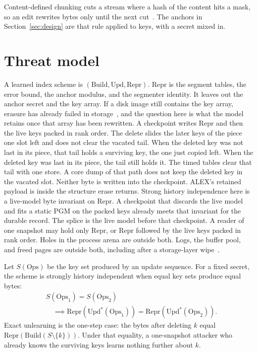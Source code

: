 \documentclass[conference]{IEEEtran}
\begin{document}
Content-defined chunking cuts a stream where a hash of the content hits a mask, so an edit rewrites bytes only until the next cut~\cite{muthitacharoen2001lbfs}.
The anchors in Section~\ref{sec:design} are that rule applied to keys, with a secret mixed in.

\section{Threat model}
\label{sec:threat}

A learned index scheme is $(\mathrm{Build},\mathrm{Upd},\mathrm{Repr})$.
$\mathrm{Repr}$ is the segment tables, the error bound, the anchor modulus, and the segmenter identity.
It leaves out the anchor secret and the key array.
If a disk image still contains the key array, erasure has already failed in storage~\cite{sarkar2023lethe,wagner2024dbsanitizer}, and the question here is what the model retains once that array has been rewritten.
A checkpoint writes $\mathrm{Repr}$ and then the live keys packed in rank order.
The delete slides the later keys of the piece one slot left and does not clear the vacated tail.
When the deleted key was not last in its piece, that tail holds a surviving key, the one just copied left.
When the deleted key was last in its piece, the tail still holds it.
The timed tables clear that tail with one store. A core dump of that path does not keep the deleted key in the vacated slot.
Neither byte is written into the checkpoint.
ALEX's retained payload is inside the structure erase returns.
Strong history independence here is a live-model byte invariant on $\mathrm{Repr}$.
A checkpoint that discards the live model and fits a static PGM on the packed keys already meets that invariant for the durable record.
The splice is the live model before that checkpoint.
A reader of one snapshot may hold only $\mathrm{Repr}$, or $\mathrm{Repr}$ followed by the live keys packed in rank order. Holes in the process arena are outside both.
Logs, the buffer pool, and freed pages are outside both, including after a storage-layer wipe~\cite{sarkar2023lethe,wagner2024dbsanitizer}.

Let $S(\mathrm{Ops})$ be the key set produced by an update sequence.
For a fixed secret, the scheme is strongly history independent when equal key sets produce equal bytes:
\[
\begin{aligned}
&S(\mathrm{Ops}_1)=S(\mathrm{Ops}_2) \\
&\quad\implies
\mathrm{Repr}(\mathrm{Upd}^*(\mathrm{Ops}_1))
=
\mathrm{Repr}(\mathrm{Upd}^*(\mathrm{Ops}_2)).
\end{aligned}
\]
Exact unlearning is the one-step case: the bytes after deleting $k$ equal $\mathrm{Repr}(\mathrm{Build}(S\setminus\{k\}))$.
Under that equality, a one-snapshot attacker who already knows the surviving keys learns nothing further about $k$.
\end{document}
